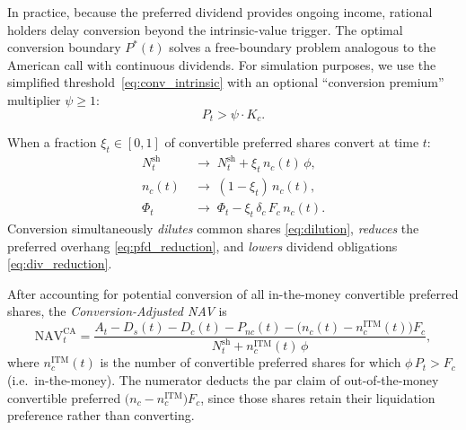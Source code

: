 \begin{remark}
In practice, because the preferred dividend provides ongoing income, rational
holders delay conversion beyond the intrinsic-value trigger.  The optimal
conversion boundary $P^*(t)$ solves a free-boundary problem analogous to the
American call with continuous dividends.  For simulation purposes, we use
the simplified threshold~\eqref{eq:conv_intrinsic} with an optional
``conversion premium'' multiplier $\psi \ge 1$:
\begin{equation}\label{eq:conv_trigger}
  P_t > \psi \cdot K_c.
\end{equation}
\end{remark}

\begin{definition}\label{def:post_conv}
When a fraction $\xi_t \in [0,1]$ of convertible preferred shares convert at
time $t$:
\begin{align}
  N_t^{\mathrm{sh}} &\;\longrightarrow\;
    N_t^{\mathrm{sh}} + \xi_t\, n_c(t)\, \phi,
    \label{eq:dilution}\\
  n_c(t) &\;\longrightarrow\; (1-\xi_t)\, n_c(t),
    \label{eq:pfd_reduction}\\
  \Phi_t &\;\longrightarrow\;
    \Phi_t - \xi_t\, \delta_c\, F_c\, n_c(t).
    \label{eq:div_reduction}
\end{align}
Conversion simultaneously \emph{dilutes} common shares
\eqref{eq:dilution}, \emph{reduces} the preferred overhang
\eqref{eq:pfd_reduction}, and \emph{lowers} dividend obligations
\eqref{eq:div_reduction}.
\end{definition}

\begin{definition}\label{def:ca_nav}
After accounting for potential conversion of all in-the-money convertible
preferred shares, the \emph{Conversion-Adjusted NAV} is
\begin{equation}\label{eq:ca_nav}
  \mathrm{NAV}_t^{\mathrm{CA}}
  = \frac{A_t - D_s(t) - D_c(t) - P_{nc}(t)
          - \bigl(n_c(t) - n_c^{\mathrm{ITM}}(t)\bigr) F_c}
         {N_t^{\mathrm{sh}} + n_c^{\mathrm{ITM}}(t)\,\phi},
\end{equation}
where $n_c^{\mathrm{ITM}}(t)$ is the number of convertible preferred shares
for which $\phi\, P_t > F_c$ (i.e.\ in-the-money).  The numerator deducts
the par claim of out-of-the-money convertible preferred
$\bigl(n_c - n_c^{\mathrm{ITM}}\bigr) F_c$, since those shares retain
their liquidation preference rather than converting.
\end{definition}

